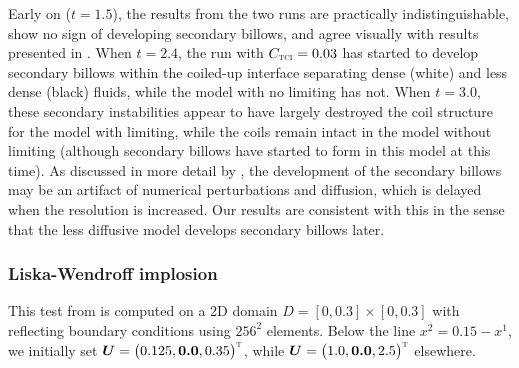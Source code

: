 \documentclass[letterpaper]{jpconf}
\newcommand{\vect}[1]{\boldsymbol{#1}}
\newcommand{\trans}{\textnormal{\tiny\textsc{T}}}
\newcommand{\TCI}{\textnormal{\tiny\textsc{TCI}}}
\begin{document}
Early on ($t=1.5$), the results from the two runs are practically indistinguishable, show no sign of developing secondary billows, and agree visually with results presented in \cite{mcnally_etal_2012}.  
When $t=2.4$, the run with $C_{\TCI}=0.03$ has started to develop secondary billows within the coiled-up interface separating dense (white) and less dense (black) fluids, while the model with no limiting has not.  
When $t=3.0$, these secondary instabilities appear to have largely destroyed the coil structure for the model with limiting, while the coils remain intact in the model without limiting (although secondary billows have started to form in this model at this time).  
As discussed in more detail by \cite{mcnally_etal_2012}, the development of the secondary billows may be an artifact of numerical perturbations and diffusion, which is delayed when the resolution is increased.  
Our results are consistent with this in the sense that the less diffusive model develops secondary billows later.  

\subsubsection{Liska-Wendroff implosion}

This test from \cite{liskaWendroff_2003} is computed on a 2D domain $D=[0,0.3]\times[0,0.3]$ with reflecting boundary conditions using $256^{2}$ elements.  
Below the line $x^{2}=0.15-x^{1}$, we initially set $\vect{U}=\big(0.125,\vect{0.0},0.35\big)^{\trans}$, while $\vect{U}=\big(1.0,\vect{0.0},2.5\big)^{\trans}$ elsewhere.  
\end{document}
